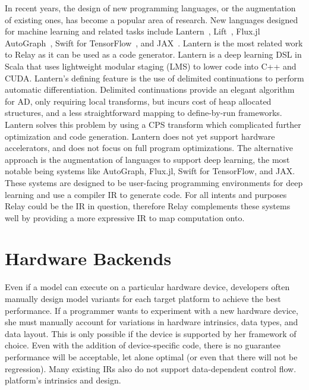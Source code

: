 In recent years, the design of new programming languages,
    or the augmentation of existing ones, has become
    a popular area of research.
New languages designed for machine learning and related
    tasks include Lantern~\citep{lantern}, Lift~\citep{lift_lang}, Flux.jl~\citep{fluxjl}
    AutoGraph~\citep{moldovan2018autograph}, Swift for TensorFlow~\citep{tf_swift},
    and JAX~\citep{jax}.
Lantern \citep{lantern} is the most related work to Relay as it can
    be used as a code generator.
Lantern is a deep learning DSL in Scala
    that uses lightweight modular staging (LMS) to lower code into C++ and CUDA.
Lantern's defining feature is the use of delimited continuations to perform
    automatic differentiation.
Delimited continuations provide an elegant algorithm for AD,
    only requiring local transforms, but incurs cost of
    heap allocated structures, and a less straightforward
    mapping to define-by-run frameworks.
Lantern solves this problem by using a CPS transform which
    complicated further optimization and code generation.
Lantern does not yet support hardware accelerators, and
    does not focus on full program optimizations.
The alternative approach is the augmentation of languages to support deep learning,
  the most notable being systems like AutoGraph, Flux.jl, Swift for TensorFlow,
  and JAX.
These systems are designed to be user-facing programming
    environments for deep learning and use a compiler IR
    to generate code.
For all intents and purposes Relay could be the IR in
    question, therefore  Relay complements these systems well by
    providing a more expressive IR to map computation onto.

\section{Hardware Backends}

Even if a model can execute on
  a particular hardware device, developers
  often manually design model
  variants for each target platform
  to achieve the best performance.
If a programmer wants to experiment with a new hardware device,
  she must manually account for variations in hardware intrinsics, data
  types, and data layout.
This is only possible if the device is supported by her framework of choice.
Even with the addition of device-specific code,
  there is no guarantee performance will be acceptable, let alone optimal
  (or even that there will not be regression).
Many existing IRs also do not support data-dependent control flow.
  platform's intrinsics and design.

